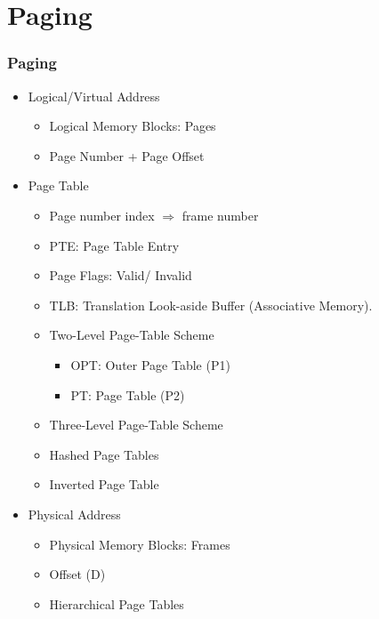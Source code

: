 \documentclass[aspectratio=169, xcolor=table, notheorems, hyperref={pdfpagelabels=false}]{beamer}
\begin{document}
\section{Paging}
\begin{frame}
\frametitle{Paging}
\begin{itemize}
\item Logical/Virtual Address
\begin{itemize}
\item Logical Memory Blocks: Pages
\item Page Number + Page Offset
\end{itemize}
\item Page Table
\begin{itemize}
\item Page number index $\Rightarrow$ frame number
\item PTE: Page Table Entry
\item Page Flags: Valid/ Invalid
\item TLB: Translation Look-aside Buffer (Associative Memory).
\item Two-Level Page-Table Scheme
\begin{itemize}
\item OPT: Outer Page Table (P1)
\item PT: Page Table (P2)
\end{itemize}
\item Three-Level Page-Table Scheme
\item Hashed Page Tables
\item Inverted Page Table
\end{itemize}
\item Physical Address
\begin{itemize}
\item Physical Memory Blocks: Frames
\item Offset (D)
\item Hierarchical Page Tables
\end{itemize}
\end{itemize}
\end{frame}

\end{document}
